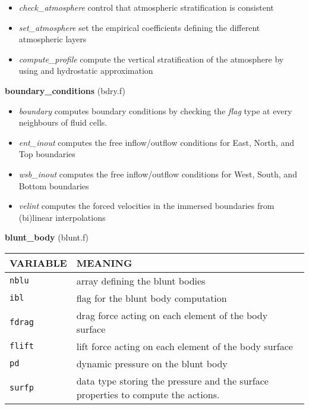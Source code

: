 \begin{itemize}
\item {\em check\_atmosphere} control that atmospheric stratification is consistent
\item {\em set\_atmosphere} set the empirical coefficients defining the different atmospheric layers
\item {\em compute\_profile} compute the vertical stratification of the atmosphere by using
 and hydrostatic approximation
\end{itemize}
%
%
{\large {\bf boundary\_conditions}} (bdry.f)\\
\begin{itemize}
\item {\em boundary} computes boundary conditions by checking the {\em flag} type at every neighbours 
of fluid cells. 
\item {\em ent\_inout} computes the free inflow/outflow conditions for East, North, and Top boundaries
\item {\em wsb\_inout} computes the free inflow/outflow conditions for West, South, and Bottom boundaries
\item {\em velint} computes the forced velocities in the immersed boundaries from (bi)linear interpolations 
\end{itemize}
%
%
{\large {\bf blunt\_body}} (blunt.f)\\[5mm]
\begin{tabular}{|p{6cm}|p{6cm}|}\hline
VARIABLE  & MEANING\\\hline
\tt nblu  & array defining the blunt bodies \\\hline
\tt ibl   & flag for the blunt body computation\\\hline
\tt fdrag & drag force acting on each element of the body surface\\\hline
\tt flift & lift force acting on each element of the body surface\\\hline
\tt pd    & dynamic pressure on the blunt body\\\hline
\tt surfp & data type storing the pressure and the surface properties to compute the actions.\\\hline
\end{tabular}\\

